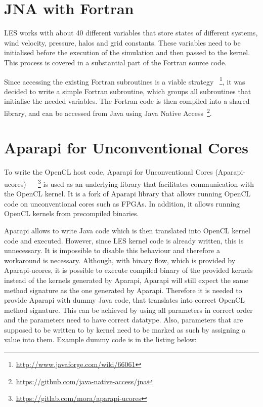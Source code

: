 \documentclass{l4proj}
\begin{document}
\section{JNA with Fortran}

LES works with about 40 different variables that store states of different systems,
wind velocity, pressure, halos and grid constants. These variables need to be initialised
before the execution of the simulation and then passed to the kernel. This process is 
covered in a substantial part of the Fortran source code.

Since accessing the existing Fortran subroutines is a viable strategy
~\footnote{\url{http://www.javaforge.com/wiki/66061}},
it was decided to write a simple Fortran subroutine, which groups 
all subroutines that initialise the needed variables. The Fortran code
is then compiled into a shared library, and can be accessed from Java using
Java Native Access~\footnote{\url{https://github.com/java-native-access/jna}}.

\section{Aparapi for Unconventional Cores}

To write the OpenCL host code, Aparapi for Unconventional Cores (Aparapi-ucores)
~\cite{aparapi_ucores}
~\footnote{\url{https://gitlab.com/mora/aparapi-ucores}}
is used as an underlying library that facilitates communication
with the OpenCL kernel. It is a fork of Aparapi library that allows
running OpenCL code on unconventional cores such as FPGAs. In addition,
it allows running OpenCL kernels from precompiled binaries.

Aparapi allows to write Java code which is then translated into OpenCL kernel code
and executed. However, since LES kernel code is already written, this is 
unnecessary. It is impossible to disable this behaviour and therefore a 
workaround is necessary. Although, with binary flow, which is provided by Aparapi-ucores,
it is possible to execute compiled binary of the provided kernels instead of 
the kernels generated by Aparapi, Aparapi will still expect the same method signature as 
the one generated by Aparapi. Therefore it is needed to provide Aparapi with
dummy Java code, that translates into correct OpenCL method signature.
This can be achieved by using all parameters in correct order and the parameters
need to have correct datatype. Also, parameters that are supposed to be written to
by kernel need to be marked as such by assigning a value into them. Example dummy
code is in the listing below:
\end{document}
